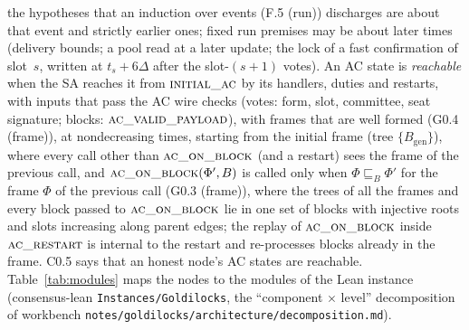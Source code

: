 \documentclass{article}
\newcommand{\genesis}{B_{\mathrm{gen}}}
\newcommand{\Fr}{\Phi}
\newcommand{\fname}[1]{\text{\textsc{#1}}}
\begin{document}
the hypotheses that an induction over events (F.5 (run)) discharges are about that
event and strictly earlier ones; fixed run premises may be about later times
(delivery bounds; a pool read at a later update; the lock of a fast
confirmation of slot~$s$, written at $t_s+6\Delta$ after the slot-$(s+1)$
votes).  An AC state is \emph{reachable} when the SA
reaches it from $\fname{initial\_ac}$ by its handlers, duties and restarts, with
inputs that pass the AC wire checks (votes: form, slot, committee, seat
signature; blocks: $\fname{ac\_valid\_payload}$), with frames that are well
formed (G0.4 (frame)), at nondecreasing times, starting from the initial frame
(tree $\{\genesis\}$), where every call other than $\fname{ac\_on\_block}$
(and a restart) sees the frame of the previous call, and
$\fname{ac\_on\_block}(\Fr',B)$ is called only when $\Fr\sqsubseteq_B\Fr'$ for
the frame $\Fr$ of the previous call (G0.3 (frame)), where the trees of all
the frames and every block passed to $\fname{ac\_on\_block}$ lie in one set of
blocks with injective roots and slots increasing along parent edges; the replay of
$\fname{ac\_on\_block}$ inside $\fname{ac\_restart}$ is internal to the restart
and re-processes blocks already in the frame.  C0.5 says that an honest node's
AC states are reachable.  Table~\ref{tab:modules} maps the
nodes to the modules of the Lean instance (consensus-lean
\texttt{Instances/Goldilocks}, the ``component $\times$ level'' decomposition of
workbench \texttt{notes/goldilocks/architecture/decomposition.md}).
\end{document}
